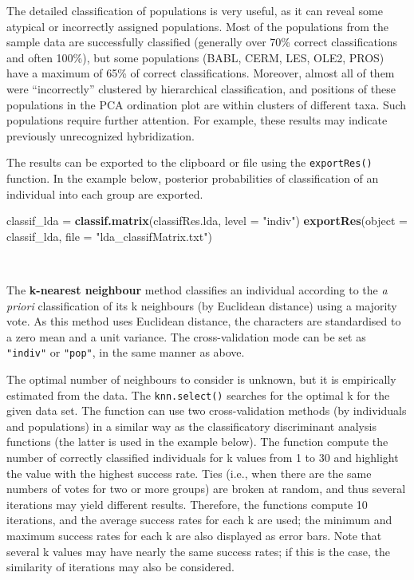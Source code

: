 \documentclass[
]{article}
\newenvironment{Shaded}{\begin{snugshade}}{\end{snugshade}}
\newcommand{\DataTypeTok}[1]{\textcolor[rgb]{0.13,0.29,0.53}{#1}}
\newcommand{\KeywordTok}[1]{\textcolor[rgb]{0.13,0.29,0.53}{\textbf{#1}}}
\newcommand{\NormalTok}[1]{#1}
\newcommand{\StringTok}[1]{\textcolor[rgb]{0.31,0.60,0.02}{#1}}
\begin{document}
The detailed classification of populations is very useful, as it can
reveal some atypical or incorrectly assigned populations. Most of the
populations from the sample data are successfully classified (generally
over 70\% correct classifications and often 100\%), but some populations
(BABL, CERM, LES, OLE2, PROS) have a maximum of 65\% of correct
classifications. Moreover, almost all of them were ``incorrectly''
clustered by hierarchical classification, and positions of these
populations in the PCA ordination plot are within clusters of different
taxa. Such populations require further attention. For example, these
results may indicate previously unrecognized hybridization.

The results can be exported to the clipboard or file using the
\texttt{exportRes()} function. In the example below, posterior
probabilities of classification of an individual into each group are
exported.

\begin{Shaded}
\begin{Highlighting}[]
\NormalTok{classif_lda =}\StringTok{ }\KeywordTok{classif.matrix}\NormalTok{(classifRes.lda, }\DataTypeTok{level =} \StringTok{"indiv"}\NormalTok{)}
\KeywordTok{exportRes}\NormalTok{(}\DataTypeTok{object =}\NormalTok{ classif_lda,}
          \DataTypeTok{file =} \StringTok{"lda_classifMatrix.txt"}\NormalTok{)}
\end{Highlighting}
\end{Shaded}

~\\
\hspace*{0.333em}

The \textbf{k-nearest neighbour} method classifies an individual
according to the \emph{a priori} classification of its k neighbours (by
Euclidean distance) using a majority vote. As this method uses Euclidean
distance, the characters are standardised to a zero mean and a unit
variance. The cross-validation mode can be set as \texttt{"indiv"} or
\texttt{"pop"}, in the same manner as above.

The optimal number of neighbours to consider is unknown, but it is
empirically estimated from the data. The \texttt{knn.select()} searches
for the optimal k for the given data set. The function can use two
cross-validation methods (by individuals and populations) in a similar
way as the classificatory discriminant analysis functions (the latter is
used in the example below). The function compute the number of correctly
classified individuals for k values from 1 to 30 and highlight the value
with the highest success rate. Ties (i.e., when there are the same
numbers of votes for two or more groups) are broken at random, and thus
several iterations may yield different results. Therefore, the functions
compute 10 iterations, and the average success rates for each k are
used; the minimum and maximum success rates for each k are also
displayed as error bars. Note that several k values may have nearly the
same success rates; if this is the case, the similarity of iterations
may also be considered.
\end{document}
